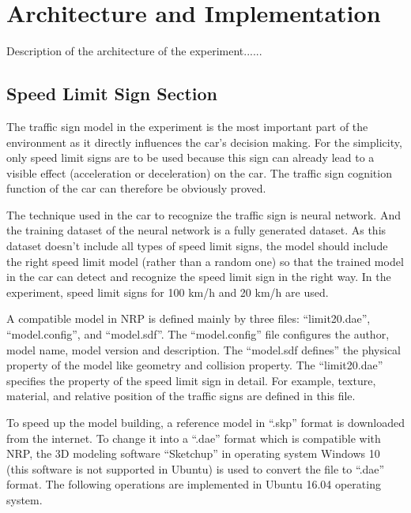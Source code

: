 
\section{Architecture and Implementation}

Description of the architecture of the experiment......

\subsection{Speed Limit Sign Section}

The traffic sign model in the experiment is the most important part of the environment as it directly influences the car’s decision making. For the simplicity, only speed limit signs are to be used because this sign can already lead to a visible effect (acceleration or deceleration) on the car. The traffic sign cognition function of the car can therefore be obviously proved. 



The technique used in the car to recognize the traffic sign is neural network. And the training dataset of the neural network is a fully generated dataset. As this dataset doesn’t include all types of speed limit signs, the model should include the right speed limit model (rather than a random one) so that the trained model in the car can detect and recognize the speed limit sign in the right way. In the experiment, speed limit signs for 100 km/h and 20 km/h are used.



A compatible model in NRP is defined mainly by three files: ``limit20.dae'', ``model.config'', and ``model.sdf''. The ``model.config'' file configures the author, model name, model version and description. The ``model.sdf defines'' the physical property of the model like geometry and collision property. The ``limit20.dae'' specifies the property of the speed limit sign in detail. For example, texture, material, and relative position of the traffic signs are defined in this file.



To speed up the model building, a reference model in ``.skp'' format is downloaded from the internet. To change it into a ``.dae'' format which is compatible with NRP, the 3D modeling software ``Sketchup'' in operating system Windows 10 (this software is not supported in Ubuntu) is used to convert the file to ``.dae'' format. The following operations are implemented in Ubuntu 16.04 operating system. 



